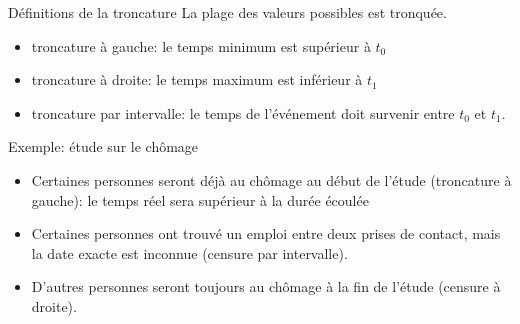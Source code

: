 \documentclass[
  ignorenonframetext,
]{beamer}
\providecommand{\tightlist}{%
  \setlength{\itemsep}{0pt}\setlength{\parskip}{0pt}}\usepackage{longtable,booktabs,array}
\begin{document}
\begin{frame}{Définitions de la troncature}
\protect\hypertarget{duxe9finitions-de-la-troncature}{}
La plage des valeurs possibles est tronquée.

\begin{itemize}
\tightlist
\item
  troncature à gauche: le temps minimum est supérieur à \(t_0\)
\item
  troncature à droite: le temps maximum est inférieur à \(t_1\)
\item
  troncature par intervalle: le temps de l'événement doit survenir entre
  \(t_0\) et \(t_1\).
\end{itemize}
\end{frame}

\begin{frame}{Exemple: étude sur le chômage}
\protect\hypertarget{exemple-uxe9tude-sur-le-chuxf4mage}{}
\begin{itemize}
\tightlist
\item
  Certaines personnes seront déjà au chômage au début de l'étude
  (troncature à gauche): le temps réel sera supérieur à la durée écoulée
\item
  Certaines personnes ont trouvé un emploi entre deux prises de contact,
  mais la date exacte est inconnue (censure par intervalle).
\item
  D'autres personnes seront toujours au chômage à la fin de l'étude
  (censure à droite).
\end{itemize}
\end{frame}
\end{document}
